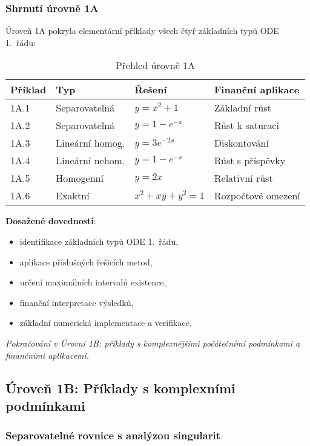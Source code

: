 \subsubsection{Shrnutí úrovně 1A}
\label{sec:shrnuti-1a}

Úroveň 1A pokryla elementární příklady všech čtyř základních typů ODE 1.~řádu:

\begin{table}[t]
\centering
\caption{Přehled úrovně 1A}
\label{tab:prehled-1a}
\begin{tabular}{|l|l|l|l|}
\hline
\textbf{Příklad} & \textbf{Typ} & \textbf{Řešení} & \textbf{Finanční aplikace} \\
\hline
1A.1 & Separovatelná & $y=x^2+1$ & Základní růst \\
1A.2 & Separovatelná & $y=1-e^{-x}$ & Růst k saturaci \\
1A.3 & Lineární homog. & $y=3e^{-2x}$ & Diskontování \\
1A.4 & Lineární nehom. & $y=1-e^{-x}$ & Růst s příspěvky \\
1A.5 & Homogenní & $y=2x$ & Relativní růst \\
1A.6 & Exaktní & $x^2+xy+y^2=1$ & Rozpočtové omezení \\
\hline
\end{tabular}
\end{table}

\textbf{Dosažené dovednosti}:
\begin{itemize}
\item identifikace základních typů ODE 1.~řádu,
\item aplikace příslušných řešicích metod,
\item určení maximálních intervalů existence,
\item finanční interpretace výsledků,
\item základní numerická implementace a verifikace.
\end{itemize}

\emph{Pokračování v Úrovni 1B: příklady s komplexnějšími počátečními podmínkami a finančními aplikacemi.}

\subsection{Úroveň 1B: Příklady s komplexními podmínkami}
\label{sec:uroven-1b}

\subsubsection{Separovatelné rovnice s analýzou singularit}
\label{subsec:1b-separovatelne}

